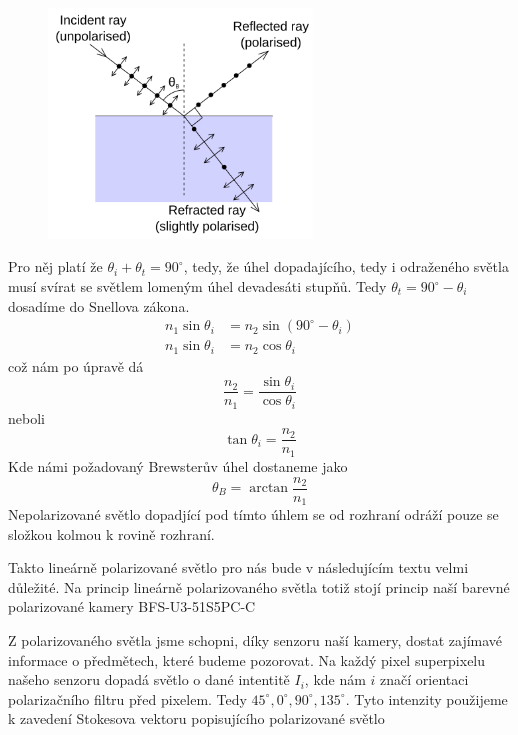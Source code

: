 \documentclass[a4paper]{article}
\numberwithin{equation}{section}
\begin{document}
    \begin{figure}[ht]
        \includegraphics[width=7cm]{figures/Brewster.png}
        \centering
    \end{figure}
    \par Pro něj platí že $\theta_i + \theta_t = 90^{\circ}$, tedy, že úhel dopadajícího, tedy i odraženého světla musí svírat se světlem lomeným úhel devadesáti stupňů. Tedy $\theta_t = 90^{\circ} - \theta_i$ dosadíme do Snellova zákona. 
    \begin{equation}
        \!
        \begin{aligned}
            n_1 \sin \theta_i &= n_2 \sin (90^{\circ} - \theta_i) \\
            n_1 \sin \theta_i &= n_2 \cos \theta_i
        \end{aligned}
    \end{equation} 
    což nám po úpravě dá 
    \begin{equation}
        \frac{n_2}{n_1} = \frac{\sin \theta_i}{\cos \theta_i}
    \end{equation}
    neboli
    \begin{equation}
        \tan \theta_i = \frac{n_2}{n_1}
    \end{equation}
    Kde námi požadovaný Brewsterův úhel dostaneme jako
    \begin{equation}
        \theta_B = \arctan \frac{n_2}{n_1}
    \end{equation}
    Nepolarizované světlo dopadjící pod tímto úhlem se od rozhraní odráží pouze se složkou kolmou k rovině rozhraní. \cite{hecht} 
    \par Takto lineárně polarizované světlo pro nás bude v následujícím textu velmi důležité. Na princip lineárně polarizovaného světla totiž stojí princip naší barevné polarizované kamery BFS-U3-51S5PC-C
    \par Z polarizovaného světla jsme schopni, díky senzoru naší kamery, dostat zajímavé informace o předmětech, které budeme pozorovat. Na každý pixel superpixelu našeho senzoru dopadá světlo o dané intentitě $I_i$, kde nám $i$ značí orientaci polarizačního filtru před pixelem. Tedy $45^{\circ}, 0^{\circ},90^{\circ}, 135^{\circ}$. Tyto intenzity použijeme k zavedení Stokesova vektoru popisujícího polarizované světlo
\end{document}

